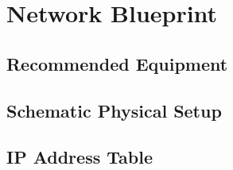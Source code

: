 \section{Network Blueprint}
\subsection{Recommended Equipment}

\subsection{Schematic Physical Setup}

\subsection{IP Address Table}
